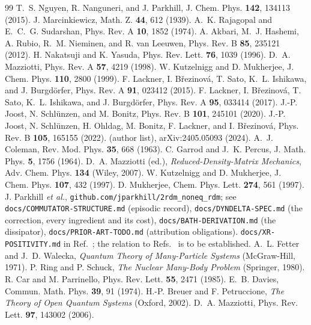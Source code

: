 \documentclass[aip,jcp,reprint,floatfix,superscriptaddress]{revtex4-2}
\begin{document}
\begin{thebibliography}{99}
 T.~S. Nguyen, R. Nanguneri, and J. Parkhill, J. Chem. Phys. \textbf{142}, 134113 (2015).
 J. Marcinkiewicz, Math. Z. \textbf{44}, 612 (1939).
 A.~K. Rajagopal and E.~C.~G. Sudarshan, Phys. Rev. A \textbf{10}, 1852 (1974).
 A. Akbari, M.~J. Hashemi, A. Rubio, R.~M. Nieminen, and R. van Leeuwen, Phys. Rev. B \textbf{85}, 235121 (2012).
 H. Nakatsuji and K. Yasuda, Phys. Rev. Lett. \textbf{76}, 1039 (1996).
 D.~A. Mazziotti, Phys. Rev. A \textbf{57}, 4219 (1998).
 W. Kutzelnigg and D. Mukherjee, J. Chem. Phys. \textbf{110}, 2800 (1999).
 F. Lackner, I. B\v{r}ezinov\'a, T. Sato, K.~L. Ishikawa, and J. Burgd\"orfer, Phys. Rev. A \textbf{91}, 023412 (2015).
 F. Lackner, I. B\v{r}ezinov\'a, T. Sato, K.~L. Ishikawa, and J. Burgd\"orfer, Phys. Rev. A \textbf{95}, 033414 (2017).
 J.-P. Joost, N. Schl\"unzen, and M. Bonitz, Phys. Rev. B \textbf{101}, 245101 (2020).
 J.-P. Joost, N. Schl\"unzen, H. Ohldag, M. Bonitz, F. Lackner, and I. B\v{r}ezinov\'a, Phys. Rev. B \textbf{105}, 165155 (2022).
 (author list), arXiv:2405.05093 (2024).
 A.~J. Coleman, Rev. Mod. Phys. \textbf{35}, 668 (1963).
 C. Garrod and J.~K. Percus, J. Math. Phys. \textbf{5}, 1756 (1964).
 D.~A. Mazziotti (ed.), \emph{Reduced-Density-Matrix Mechanics}, Adv. Chem. Phys. \textbf{134} (Wiley, 2007).
 W. Kutzelnigg and D. Mukherjee, J. Chem. Phys. \textbf{107}, 432 (1997).
 D. Mukherjee, Chem. Phys. Lett. \textbf{274}, 561 (1997).
 J. Parkhill \emph{et al.}, \texttt{github.com/jparkhill/2rdm\_noneq\_rdm}; see \texttt{docs/COMMUTATOR-STRUCTURE.md} (episodic record), \texttt{docs/DYNDELTA-SPEC.md} (the correction, every ingredient and its cost), \texttt{docs/BATH-DERIVATION.md} (the dissipator), \texttt{docs/PRIOR-ART-TODO.md} (attribution obligations).
 \texttt{docs/XR-POSITIVITY.md} in Ref.~; the relation to Refs.~ is to be established.
 A.~L. Fetter and J.~D. Walecka, \emph{Quantum Theory of Many-Particle Systems} (McGraw-Hill, 1971).
 P. Ring and P. Schuck, \emph{The Nuclear Many-Body Problem} (Springer, 1980).
 R. Car and M. Parrinello, Phys. Rev. Lett. \textbf{55}, 2471 (1985).
 E.~B. Davies, Commun. Math. Phys. \textbf{39}, 91 (1974).
 H.-P. Breuer and F. Petruccione, \emph{The Theory of Open Quantum Systems} (Oxford, 2002).
 D.~A. Mazziotti, Phys. Rev. Lett. \textbf{97}, 143002 (2006).
\end{thebibliography}
\end{document}
